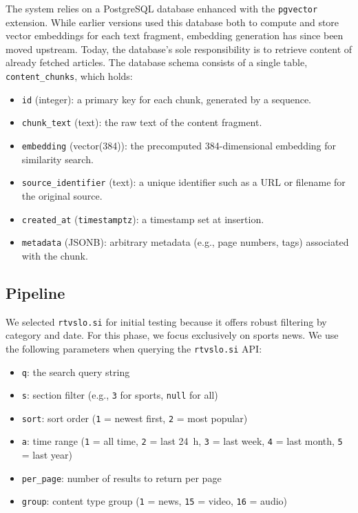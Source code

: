 \documentclass[fleqn,moreauthors,10pt]{ds_report}
\begin{document}
The system relies on a PostgreSQL database enhanced with the \texttt{pgvector} extension. While earlier versions used this database both to compute and store vector embeddings for each text fragment, embedding generation has since been moved upstream. Today, the database’s sole responsibility is to retrieve content of already fetched articles. The database schema consists of a single table, \texttt{content\_chunks}, which holds:
\begin{itemize}
  \item \texttt{id} (integer): a primary key for each chunk, generated by a sequence.
  \item \texttt{chunk\_text} (text): the raw text of the content fragment.
  \item \texttt{embedding} (vector(384)): the precomputed 384-dimensional embedding for similarity search.
  \item \texttt{source\_identifier} (text): a unique identifier such as a URL or filename for the original source.
  \item \texttt{created\_at} (\texttt{timestamptz}): a timestamp set at insertion.
  \item \texttt{metadata} (JSONB): arbitrary metadata (e.g., page numbers, tags) associated with the chunk.
\end{itemize}

\subsection*{Pipeline}

We selected \texttt{rtvslo.si} for initial testing because it offers robust filtering by category and date. For this phase, we focus exclusively on sports news. We use the following parameters when querying the \texttt{rtvslo.si} API:

\begin{itemize}
  \item \texttt{q}: the search query string
  \item \texttt{s}: section filter (e.g., \texttt{3} for sports, \texttt{null} for all)
  \item \texttt{sort}: sort order (\texttt{1} = newest first, \texttt{2} = most popular)
  \item \texttt{a}: time range (\texttt{1} = all time, \texttt{2} = last 24 h, \texttt{3} = last week, \texttt{4} = last month, \texttt{5} = last year)
  \item \texttt{per\_page}: number of results to return per page
  \item \texttt{group}: content type group (\texttt{1} = news, \texttt{15} = video, \texttt{16} = audio)
\end{itemize}
\end{document}
